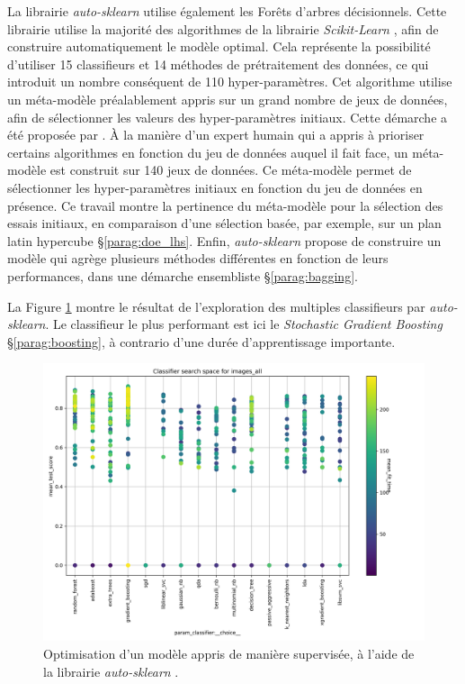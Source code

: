 La librairie \textit{auto-sklearn} \cite{feurer_efficient_2015} utilise également les Forêts d'arbres décisionnels.
Cette librairie utilise la majorité des algorithmes de la librairie \textit{Scikit-Learn} \cite{pedregosa_scikit-learn_2011}, afin de construire automatiquement le modèle optimal.
Cela représente la possibilité d'utiliser 15 classifieurs et 14 méthodes de prétraitement des données, ce qui introduit un nombre conséquent de 110 hyper-paramètres.
Cet algorithme utilise un méta-modèle préalablement appris sur un grand nombre de jeux de données, afin de sélectionner les valeurs des hyper-paramètres initiaux.
Cette démarche a été proposée par \citeauthor{feurer_initializing_2015} \cite{feurer_initializing_2015}.
À la manière d'un expert humain qui a appris à prioriser certains algorithmes en fonction du jeu de données auquel il fait face, un méta-modèle est construit sur 140 jeux de données.
Ce méta-modèle permet de sélectionner les hyper-paramètres initiaux en fonction du jeu de données en présence.
Ce travail montre la pertinence du méta-modèle pour la sélection des essais initiaux, en comparaison d'une sélection basée, par exemple, sur un plan latin hypercube §\ref{parag:doe_lhs}.
Enfin, \textit{auto-sklearn} propose de construire un modèle qui agrège plusieurs méthodes différentes en fonction de leurs performances, dans une démarche ensembliste §\ref{parag:bagging}.

La Figure \ref{fig:autosk_result} montre le résultat de l'exploration des multiples classifieurs par \textit{auto-sklearn}.
Le classifieur le plus performant est ici le \textit{Stochastic Gradient Boosting} §\ref{parag:boosting}, à contrario d'une durée d'apprentissage importante.

\begin{figure}[hbtp]
    \centering
    \includegraphics[width=\textwidth,height=\textheight,keepaspectratio]{../Chap3/Figures/cv_results_images_all.png}
    \caption{Optimisation d'un modèle appris de manière supervisée, à l'aide de la librairie \textit{auto-sklearn} \cite{feurer_efficient_2015}.}
    \label{fig:autosk_result}
\end{figure}



